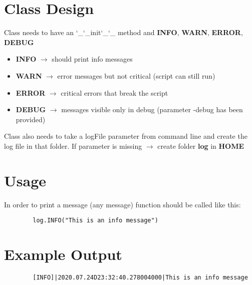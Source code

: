 \documentclass{article}
\begin{document}
\section{Class Design}
	Class needs to have an \char`_\char`_init\char`_\char`_ method and \textbf{INFO}, \textbf{WARN}, \textbf{ERROR}, \textbf{DEBUG}
	\begin{itemize}
		\item \textbf{INFO} $\rightarrow$ should print info messages
		\item \textbf{WARN} $\rightarrow$ error messages but not critical (script can still run)
		\item \textbf{ERROR} $\rightarrow$ critical errors that break the script
		\item \textbf{DEBUG} $\rightarrow$ messages visible only in debug (parameter -debug has been provided)
	\end{itemize}
	Class also needs to take a logFile parameter from command line and create the log file in that folder. If parameter is missing $\rightarrow$ create folder \textbf{log} in \textbf{HOME}

\section{Usage}
	In order to print a message (any message) function should be called like this: 
	\begin{verbatim}
		log.INFO("This is an info message")
	\end{verbatim}

\section{Example Output}
	\begin{verbatim}
		[INFO]|2020.07.24D23:32:40.278004000|This is an info message
	\end{verbatim}
\end{document}

